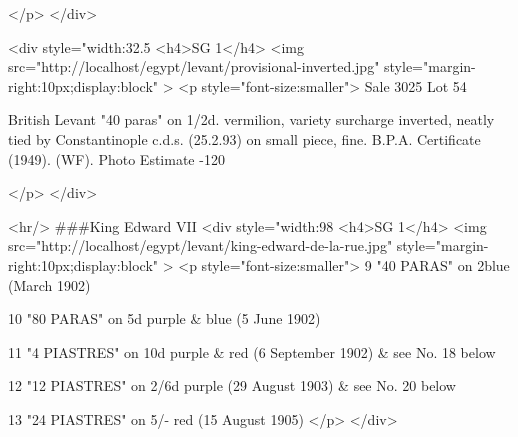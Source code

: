 </p>
</div>

<div style="width:32.5%
<h4>SG 1</h4>
<img src="http://localhost/egypt/levant/provisional-inverted.jpg" style="margin-right:10px;display:block"  >
<p style="font-size:smaller">
Sale 3025 Lot 54

British Levant
 "40 paras" on 1/2d. vermilion, variety surcharge inverted, neatly tied by Constantinople c.d.s. (25.2.93) on small piece, fine. B.P.A. Certificate (1949). (WF). Photo
Estimate -120 

</p>
</div>

<hr/>
\#\#\#King Edward VII
<div style="width:98%
<h4>SG 1</h4>
<img src="http://localhost/egypt/levant/king-edward-de-la-rue.jpg" style="margin-right:10px;display:block"  >
<p style="font-size:smaller">
9 "40 PARAS" on 2\halfd blue (March 1902)

10 "80 PARAS" on 5d purple & blue (5 June 1902)

11 "4 PIASTRES" on 10d purple & red (6 September 1902) & see No. 18 below

12 "12 PIASTRES" on 2/6d purple (29 August 1903) & see No. 20 below

13 "24 PIASTRES" on 5/- red (15 August 1905) 
</p>
</div>





                      